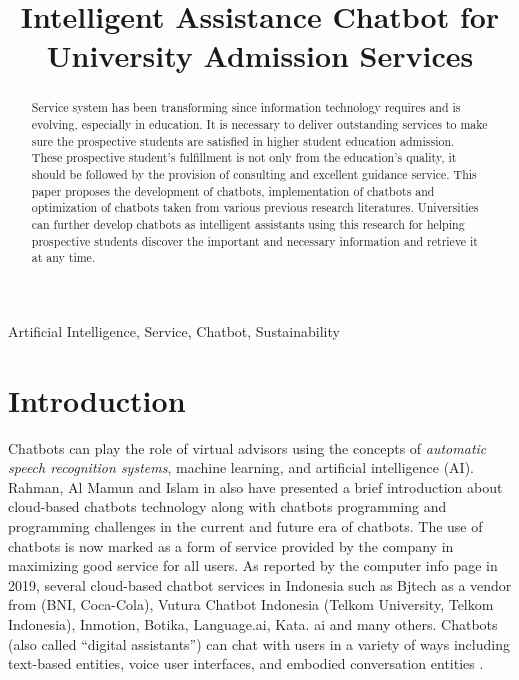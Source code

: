 \documentclass[conference]{IEEEtran}
\begin{document}
\title{Intelligent Assistance Chatbot for University Admission Services\\
{\footnotesize \textsuperscript{}}
}

\author{

\and
{}

}
\maketitle
\begin{abstract}
Service system has been transforming since information technology requires and is evolving, especially in education. It is necessary to deliver outstanding services to make sure the prospective students are satisfied in higher student education admission. These prospective student’s fulfillment is not only from the education’s quality, it should be followed by the provision of consulting and excellent guidance service. This paper proposes the development of chatbots, implementation of chatbots and optimization of chatbots taken from various previous research literatures. Universities can further develop chatbots as intelligent assistants using this research for helping prospective students discover the important and necessary information and retrieve it at any time.
\end{abstract}
\begin{IEEEkeywords}
Artificial Intelligence, Service, Chatbot, Sustainability
\end{IEEEkeywords}

\section{Introduction}
Chatbots can play the role of virtual advisors using the concepts of \emph{automatic speech recognition systems}, machine learning, and artificial intelligence (AI)\cite{b1}. Rahman, Al Mamun and Islam in \cite{b1} also have presented a brief introduction about cloud-based chatbots technology along with chatbots programming and programming challenges in the current and future era of chatbots.
The use of chatbots is now marked as a form of service provided by the company in maximizing good service for all users. As reported by the computer info page in 2019, several cloud-based chatbot services in Indonesia such as Bjtech as a vendor from (BNI, Coca-Cola), Vutura Chatbot Indonesia (Telkom University, Telkom Indonesia), Inmotion, Botika, Language.ai, Kata. ai and many others. Chatbots (also called “digital assistants”) can chat with users in a variety of ways including text-based entities, voice user interfaces, and embodied conversation entities \cite{b2}.
\end{document}

